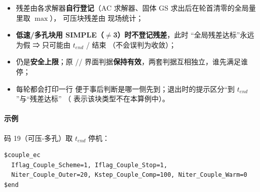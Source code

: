 \begin{itemize}
  \item 残差由各求解器\textbf{自行登记}（AC 求解器、固体 GS 求出后在轮首清零的全局量里取 $\max$），
        可压块残差由  现场统计；
  \item \textbf{低速/多孔块用 SIMPLE（$\ne$3）时不登记残差}，此时
        “全局残差达标”永远为假 ⇒ 只可能由 $t_{end}$ /  结束
        （不会误判为收敛）；
  \item {} 仍是\textbf{安全上限}；原 //
        界面判据\textbf{保持有效}，两套判据互相独立，谁先满足谁停；
  \item 每轮都会打印一行 
        便于事后判断是哪一侧先到；退出时的提示区分“到 $t_{end}$”与“残差达标”
        （ 表示该块类型不在本算例中）。
\end{itemize}

\paragraph{示例}码 19（可压-多孔）取 $t_{end}$ 停机：
\begin{verbatim}
$couple_ec
  Iflag_Couple_Scheme=1, Iflag_Couple_Stop=1,
  Niter_Couple_Outer=20, Kstep_Couple_Comp=100, Niter_Couple_Warm=0
$end
\end{verbatim}

